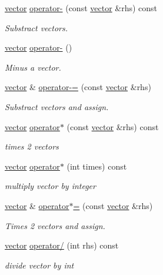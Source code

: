 \begin{DoxyCompactItemize}
\hyperlink{classvector}{vector} \hyperlink{classvector_ad9596a53b6aef33bbddfa7b9b4b17f09}{operator-\/} (const \hyperlink{classvector}{vector} \&rhs) const 
\begin{DoxyCompactList}\small\item\em Substract vectors. \end{DoxyCompactList}\item 
\hyperlink{classvector}{vector} \hyperlink{classvector_a8ddd676da71e88fa5b26efef010141ba}{operator-\/} ()
\begin{DoxyCompactList}\small\item\em Minus a vector. \end{DoxyCompactList}\item 
\hyperlink{classvector}{vector} \& \hyperlink{classvector_a9229a3d50eae5ce544f81419d49540ce}{operator-\/=} (const \hyperlink{classvector}{vector} \&rhs)
\begin{DoxyCompactList}\small\item\em Substract vectors and assign. \end{DoxyCompactList}\item 
\hyperlink{classvector}{vector} \hyperlink{classvector_a925d23adbfbbbc9659e10d18cc4dba45}{operator$\ast$} (const \hyperlink{classvector}{vector} \&rhs) const 
\begin{DoxyCompactList}\small\item\em times 2 vectors \end{DoxyCompactList}\item 
\hyperlink{classvector}{vector} \hyperlink{classvector_a13f7c51d1e14bae0c74032b6a053b1e8}{operator$\ast$} (int times) const 
\begin{DoxyCompactList}\small\item\em multiply vector by integer \end{DoxyCompactList}\item 
\hyperlink{classvector}{vector} \& \hyperlink{classvector_ad7dba928c0f8e3bef217dd1d97ebfb8f}{operator$\ast$=} (const \hyperlink{classvector}{vector} \&rhs)
\begin{DoxyCompactList}\small\item\em Times 2 vectors and assign. \end{DoxyCompactList}\item 
\hyperlink{classvector}{vector} \hyperlink{classvector_a94f6a7eeb016bbb4b296eeafb507679c}{operator/} (int rhs) const 
\begin{DoxyCompactList}\small\item\em divide vector by int \end{DoxyCompactList}\item 

\end{DoxyCompactItemize}
